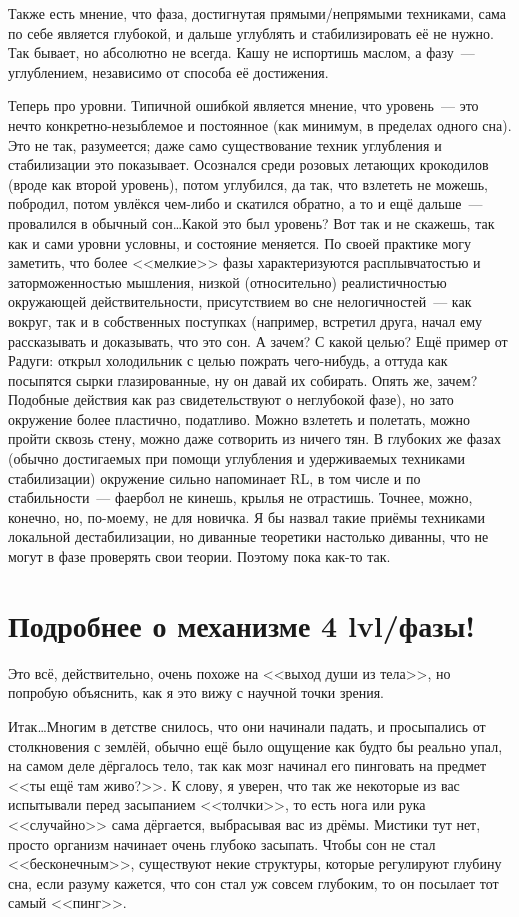 \documentclass[a4paper,14pt,oneside]{memoir}
\begin{document}
Также есть мнение, что фаза, достигнутая прямыми/не\-пря\-мы\-ми техниками, сама по себе является глубокой, и дальше углублять и стабилизировать её не нужно. Так бывает, но абсолютно не всегда. Кашу не испортишь маслом, а фазу~--- углублением, независимо от способа её достижения.

Теперь про уровни. Типичной ошибкой является мнение, что уровень~--- это нечто конкретно-незыблемое и постоянное (как минимум, в пределах одного сна). Это не так, разумеется; даже само существование техник углубления и стабилизации это показывает. Осознался среди розовых летающих крокодилов (вроде как второй уровень), потом углубился, да так, что взлететь не можешь, побродил, потом увлёкся чем-либо и скатился обратно, а то и ещё дальше~--- провалился в обычный сон\ldots Какой это был уровень? Вот так и не скажешь, так как и сами уровни условны, и состояние меняется. По своей практике могу заметить, что более <<мелкие>> фазы характеризуются расплывчатостью и заторможенностью мышления, низкой (относительно) реалистичностью окружающей действительности, присутствием во сне нелогичностей~--- как вокруг, так и в собственных поступках (например, встретил друга, начал ему рассказывать и доказывать, что это сон. А зачем? С какой целью? Ещё пример от Радуги: открыл холодильник с целью пожрать чего-нибудь, а оттуда как посыпятся сырки глазированные, ну он давай их собирать. Опять же, зачем? Подобные действия как раз свидетельствуют о неглубокой фазе), но зато окружение более пластично, податливо. Можно взлететь и полетать, можно пройти сквозь стену, можно даже сотворить из ничего тян. В глубоких же фазах (обычно достигаемых при помощи углубления и удерживаемых техниками стабилизации) окружение сильно напоминает RL, в том числе и по стабильности~--- фаербол не кинешь, крылья не отрастишь. Точнее, можно, конечно, но, по-моему, не для новичка. Я бы назвал такие приёмы техниками локальной дестабилизации, но диванные теоретики настолько диванны, что не могут в фазе проверять свои теории. Поэтому пока как-то так.




\section{Подробнее о механизме 4 lvl/фазы!}  
Это всё, действительно, очень похоже на <<выход души из тела>>, но попробую объяснить, как я это вижу с научной точки зрения.

Итак\ldots Многим в детстве снилось, что они начинали падать, и просыпались от столкновения с землёй, обычно ещё было ощущение как будто бы реально упал, на самом деле дёргалось тело, так как мозг начинал его пинговать на предмет <<ты ещё там живо?>>. К слову, я уверен, что так же некоторые из вас испытывали перед засыпанием <<толчки>>, то есть нога или рука <<случайно>> сама дёргается, выбрасывая вас из дрёмы. Мистики тут нет, просто организм начинает очень глубоко засыпать. Чтобы сон не стал <<бесконечным>>, существуют некие структуры, которые регулируют глубину сна, если разуму кажется, что сон стал уж совсем глубоким, то он посылает тот самый <<пинг>>.
\end{document}
